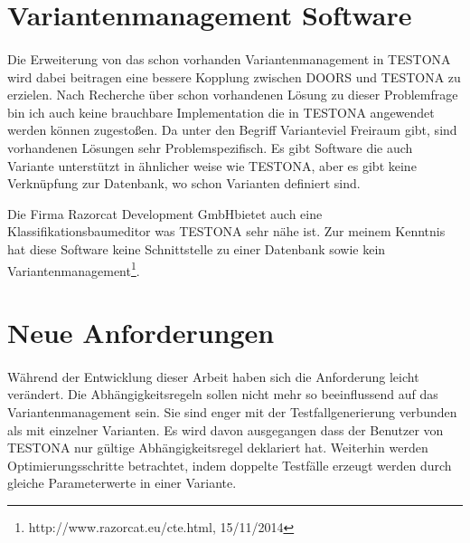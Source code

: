 \section{Variantenmanagement Software}
\paragraph{}
Die Erweiterung von das schon vorhanden Variantenmanagement in TESTONA wird dabei beitragen eine bessere Kopplung zwischen DOORS und TESTONA zu erzielen. Nach Recherche über schon vorhandenen Lösung zu dieser Problemfrage bin ich auch keine brauchbare Implementation die in TESTONA angewendet werden können zugestoßen. Da unter den Begriff \glqq Variante\grqq viel Freiraum gibt, sind vorhandenen Lösungen sehr Problemspezifisch. Es gibt Software die auch Variante unterstützt in ähnlicher weise wie TESTONA, aber es gibt keine Verknüpfung zur Datenbank, wo schon Varianten definiert sind.

Die Firma \glqq Razorcat Development GmbH\grqq bietet auch eine Klassifikationsbaumeditor was TESTONA sehr nähe ist. Zur meinem Kenntnis hat diese Software keine Schnittstelle zu einer Datenbank sowie kein Variantenmanagement\footnote{http://www.razorcat.eu/cte.html, 15/11/2014}.

\section{Neue Anforderungen}
\paragraph{}
Während der Entwicklung dieser Arbeit haben sich die Anforderung leicht verändert. Die Abhängigkeitsregeln sollen nicht mehr so beeinflussend auf das Variantenmanagement sein. Sie sind enger mit der Testfallgenerierung verbunden als mit einzelner Varianten. Es wird davon ausgegangen dass der Benutzer von TESTONA nur gültige Abhängigkeitsregel deklariert hat. Weiterhin werden Optimierungsschritte betrachtet, indem doppelte Testfälle erzeugt werden durch gleiche Parameterwerte in einer Variante. 